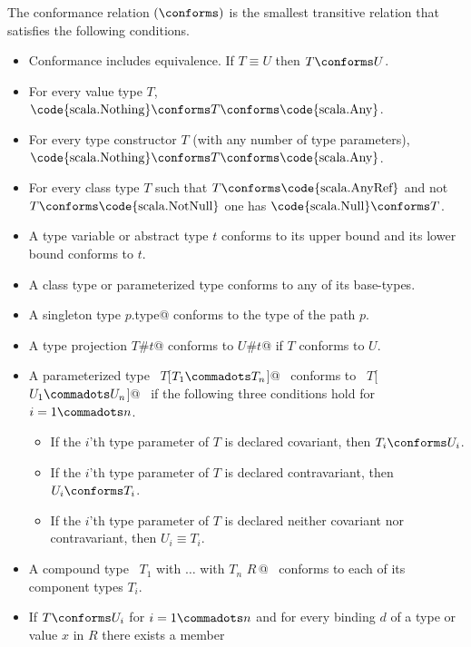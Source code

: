 The conformance relation $(\conforms)$ is the smallest 
transitive relation that satisfies the following conditions.
\begin{itemize}
\item Conformance includes equivalence. If $T \equiv U$ then $T \conforms U$.
\item For every value type $T$, 
      $\mbox{\code{scala.Nothing}} \conforms T \conforms \mbox{\code{scala.Any}}$. 
\item For every type constructor $T$ (with any number of type parameters), 
      $\mbox{\code{scala.Nothing}} \conforms T \conforms \mbox{\code{scala.Any}}$. %
      
\item For every class type $T$ such that $T \conforms
  \mbox{\code{scala.AnyRef}}$ and not $T \conforms \mbox{\code{scala.NotNull}}$
        one has $\mbox{\code{scala.Null}} \conforms T$.
\item A type variable or abstract type $t$ conforms to its upper bound and
      its lower bound conforms to $t$. 
\item A class type or parameterized type conforms to any of its
  base-types.
\item A singleton type \lstinline@$p$.type@ conforms to the type of
  the path $p$.
\item A type projection \lstinline@$T$#$t$@ conforms to \lstinline@$U$#$t$@ if 
      $T$ conforms to $U$.
\item A parameterized type ~\lstinline@$T$[$T_1 \commadots T_n$]@~ conforms to 
      ~\lstinline@$T$[$U_1 \commadots U_n$]@~ if
      the following three conditions hold for $i = 1 \commadots n$. 
      \begin{itemize}
      \item
      If the $i$'th type parameter of $T$ is declared covariant, then $T_i \conforms U_i$.
      \item
      If the $i$'th type parameter of $T$ is declared contravariant, then $U_i \conforms T_i$.
      \item
      If the $i$'th type parameter of $T$ is declared neither covariant 
      nor contravariant, then $U_i \equiv T_i$.
      \end{itemize}
\item A compound type ~\lstinline@$T_1$ with $\ldots$ with $T_n$ {$R\,$}@~ conforms to
      each of its component types $T_i$.
\item If $T \conforms U_i$ for $i = 1 \commadots n$ and for every
      binding $d$ of a type or value $x$ in $R$ there exists a member

\end{itemize}
